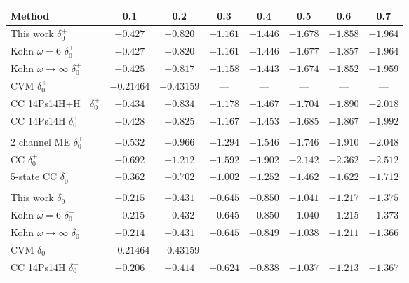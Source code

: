 \documentclass[Dissertation.tex]{subfiles}
\begin{document}
\begin{table}[H]
\centering
\footnotesize
\begin{tabular}{l c c c c c c c}
\toprule
Method & 0.1 & 0.2 & 0.3 & 0.4 & 0.5 & 0.6 & 0.7 \\
\midrule
This work $\delta_0^+$ & $-0.427$ & $-0.820$ & $-1.161$ & $-1.446$ & $-1.678$ & $-1.858$ & $-1.964$ \\
Kohn $\omega = 6$ \cite{VanReeth2003} $\delta_0^+$ & $-0.427$ & $-0.820$ & $-1.161$ & $-1.446$ & $-1.677$ & $-1.857$ & $-1.964$ \\
Kohn $\omega \rightarrow \infty$ \cite{VanReeth2003} $\delta_0^+$ & $-0.425$ & $-0.817$ & $-1.158$ & $-1.443$ & $-1.674$ & $-1.852$ & $-1.959$ \\
CVM \cite{Zhang2012} $\delta_0^+$ & $-0.21464$ & $-0.43159$ &    ---     &    ---     &    ---     &    ---     &    ---    \\
CC 14Ps14H+H$^-$ \cite{Walters2004} $\delta_0^+$ & $-0.434$ & $-0.834$ & $-1.178$ & $-1.467$ & $-1.704$ & $-1.890$ & $-2.018$ \\
CC 14Ps14H \cite{Blackwood2002} $\delta_0^+$ & $-0.428$ & $-0.825$ & $-1.167$ & $-1.453$ & $-1.685$ & $-1.867$ & $-1.992$ \\
\cite{Biswas2003} & \\
2 channel ME \cite{Biswas2001} $\delta_0^+$ & $-0.532$ & $-0.966$ & $-1.294$ & $-1.546$ & $-1.746$ & $-1.910$ & $-2.048$ \\
CC \cite{Ray1997} $\delta_0^+$ & $-0.692$ & $-1.212$ & $-1.592$ & $-1.902$ & $-2.142$ & $-2.362$ & $-2.512$ \\
5-state CC \cite{Adhikari1999} $\delta_0^+$ & $-0.362$ & $-0.702$ & $-1.002$ & $-1.252$ & $-1.462$ & $-1.622$ & $-1.712$ \\
\cite{Hara1975} & \\
\midrule
This work $\delta_0^-$ & $-0.215$ & $-0.431$ & $-0.645$ & $-0.850$ & $-1.041$ & $-1.217$ & $-1.375$ \\
Kohn $\omega = 6$ \cite{VanReeth2003} $\delta_0^-$ & $-0.215$ & $-0.432$ & $-0.645$ & $-0.850$ & $-1.040$ & $-1.215$ & $-1.373$ \\
Kohn $\omega \rightarrow \infty$ \cite{VanReeth2003} $\delta_0^-$ & $-0.214$ & $-0.431$ & $-0.645$ & $-0.849$ & $-1.038$ & $-1.211$ & $-1.366$ \\
CVM \cite{Zhang2012} $\delta_0^-$ & $-0.21464$ & $-0.43159$ & --- & --- &  --- &  --- &  --- \\
CC 14Ps14H \cite{Blackwood2002} $\delta_0^-$ & $-0.206$ & $-0.414$ & $-0.624$ & $-0.838$ & $-1.037$ & $-1.213$ & $-1.367$ \\

\end{tabular}
\end{table}
\end{document}
